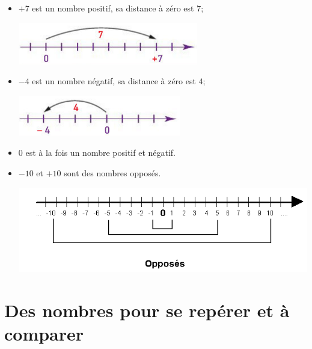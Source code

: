 \documentclass[xcolor={dvipsnames}]{beamer}
\begin{document}
\begin{frame}
	\begin{myexs}
		\begin{itemize}
			\item $+7$ est un nombre \pause positif, sa distance à zéro est \pause $7$; 
			\begin{center}
				\includegraphics[scale=0.6]{ex1}\pause
			\end{center}
			\item $\num{-4}$ est un nombre \pause négatif, sa distance à zéro est \pause $\num{4}$;
			\begin{center}
				\includegraphics[scale=0.6]{ex2}\pause
			\end{center}
			
			\item $0$ est \pause à la fois un nombre positif et négatif.%
			\item $-10$ et $+10$ sont \pause des nombres opposés.
			\begin{center}
				\includegraphics[scale=0.5]{opposes}
			\end{center}
		\end{itemize}
	\end{myexs}
\end{frame}

\section{Des nombres pour se repérer et à comparer}
\end{document}
